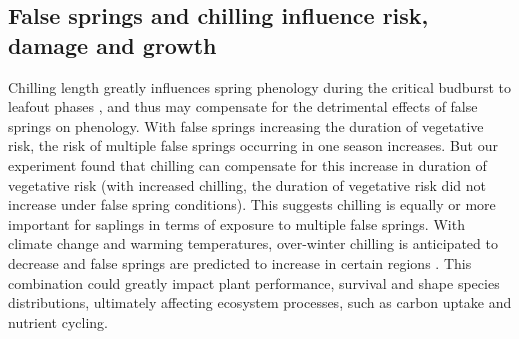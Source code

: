 \documentclass{article}\usepackage[]{graphicx}\usepackage[]{color}
\begin{document}
\subsection*{False springs and chilling influence risk, damage and growth} 
Chilling length greatly influences spring phenology during the critical budburst to leafout phases \citep{Chuine2001, Laube2014}, and thus may compensate for the detrimental effects of false springs on phenology. With false springs increasing the duration of vegetative risk, the risk of multiple false springs occurring in one season increases. But our experiment found that chilling can compensate for this increase in duration of vegetative risk (with increased chilling, the duration of vegetative risk did not increase under false spring conditions). This suggests chilling is equally or more important for saplings in terms of exposure to multiple false springs. With climate change and warming temperatures, over-winter chilling is anticipated to decrease \citep{Laube2014} and false springs are predicted to increase in certain regions \citep{Ault2015, Liu2018}. This combination could greatly impact plant performance, survival and shape species distributions, ultimately affecting ecosystem processes, such as carbon uptake and nutrient cycling.
 
\end{document}
